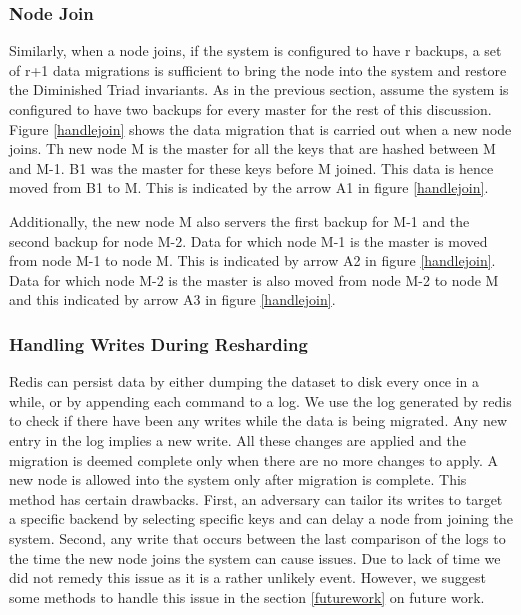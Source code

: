 \documentclass[10pt,twocolumn,letterpaper]{article}
\begin{document}
\subsubsection{Node Join}
Similarly, when a node joins, if the system is configured to have r backups,  a set of r+1 data migrations is sufficient to bring the node into the system and restore the Diminished Triad invariants. As in the previous section, assume the system is configured to have two backups for every master for the rest of this discussion. Figure \ref{handlejoin} shows the data migration that is carried out when a new node joins. Th new node M is the master for all the keys that are hashed between M and M-1. B1 was the master for these keys before M joined. This data is hence moved from B1 to M. This is indicated by the arrow A1 in figure \ref{handlejoin}. 

Additionally, the new node M also servers the first backup for M-1 and the second backup for node M-2. Data for which node M-1 is the master is moved from node M-1 to node M. This is indicated by arrow A2 in figure \ref{handlejoin}. Data for which node M-2 is the master is also moved from node M-2 to node M and this indicated by arrow A3 in figure \ref{handlejoin}.

\subsubsection{Handling Writes During Resharding}
Redis can persist data by either dumping the dataset to disk every once in a while, or by appending each command to a log. We use the log generated by redis to check if there have been any writes while the data is being migrated. Any new entry in the log implies a new write. All these changes are applied and the migration is deemed complete only when there are no more changes to apply. A new node is allowed into the system only after migration is complete. This method has certain drawbacks. First, an adversary can tailor its writes to target a specific backend by selecting specific keys and can delay a node from joining the system. Second, any write that occurs between the last comparison of the logs to the time the new node joins the system can cause issues. Due to lack of time we did not remedy this issue as it is a rather unlikely event. However, we suggest some methods to handle this issue in the section \ref{futurework} on future work.
\end{document}
